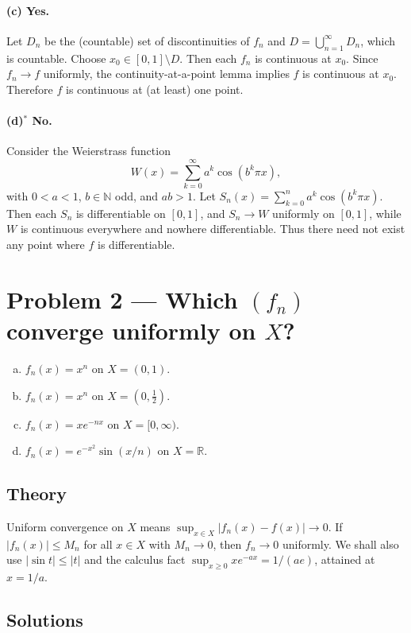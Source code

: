 \documentclass[12pt,a4paper]{article}
\theoremstyle{plain}
\theoremstyle{definition}
\theoremstyle{remark}
\theoremstyle{remark}
\begin{document}
\paragraph{(c) Yes.}
Let $D_n$ be the (countable) set of discontinuities of $f_n$ and $D=\bigcup_{n=1}^\infty D_n$, which is countable. Choose $x_0\in[0,1]\setminus D$. Then each $f_n$ is continuous at $x_0$. Since $f_n\to f$ uniformly, the continuity-at-a-point lemma implies $f$ is continuous at $x_0$. Therefore $f$ is continuous at (at least) one point.

\paragraph{(d)$^\ast$ No.}
Consider the Weierstrass function
\[
W(x)=\sum_{k=0}^\infty a^k\cos(b^k\pi x),
\]
with $0<a<1$, $b\in\mathbb{N}$ odd, and $ab>1$. Let $S_n(x)=\sum_{k=0}^n a^k\cos(b^k\pi x)$. Then each $S_n$ is differentiable on $[0,1]$, and $S_n\to W$ uniformly on $[0,1]$, while $W$ is continuous everywhere and nowhere differentiable. Thus there need not exist any point where $f$ is differentiable.
	
	
\section*{Problem 2 — Which $(f_n)$ converge uniformly on $X$?}

\begin{enumerate}[(a)]
	\item $f_n(x)=x^n$ on $X=(0,1)$.
	\item $f_n(x)=x^n$ on $X=(0,\tfrac12)$.
	\item $f_n(x)=x e^{-n x}$ on $X=[0,\infty)$.
	\item $f_n(x)=e^{-x^2}\sin(x/n)$ on $X=\mathbb{R}$.
\end{enumerate}

\subsection*{Theory}
Uniform convergence on $X$ means $\sup_{x\in X}|f_n(x)-f(x)|\to0$. If $|f_n(x)|\le M_n$ for all $x\in X$ with $M_n\to0$, then $f_n\to0$ uniformly. We shall also use $|\sin t|\le|t|$ and the calculus fact $\sup_{x\ge0} x e^{-a x}=1/(a e)$, attained at $x=1/a$.

\subsection*{Solutions}
\end{document}
